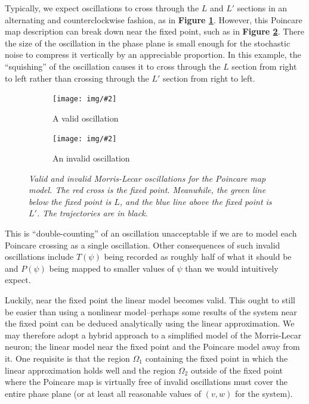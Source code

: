 \documentclass[letterpaper,12pt]{article}
\numberwithin{table}{section}
\numberwithin{figure}{section}
\numberwithin{equation}{section}
\newcommand{\centerfig}[2]{\begin{center}\texttt{[image: img/\#2]}\end{center}}
\newcommand{\ccaption}[1]{\caption{\textit{#1}}}
\newcommand{\reffig}[1]{\textbf{Figure \ref{#1}}}
\begin{document}
\begin{flushleft}
    Typically, we expect oscillations to cross through the $L$ and $L'$ sections in an alternating and counterclockwise fashion, as in \reffig{fig:valid}. However, this Poincare map description can break down near the fixed point, such as in \reffig{fig:invalid-l}. There the size of the oscillation in the phase plane is small enough for the stochastic noise to compress it vertically by an appreciable proportion. In this example, the ``squishing'' of the oscillation causes it to cross through the $L$ section from right to left rather than crossing through the $L'$ section from right to left.
    \begin{figure}[h]

        \centering
    
        \begin{subfigure}{0.49\textwidth}
            \centerfig{0.6}{valid.jpg}
            \caption{A valid oscillation}
            \label{fig:valid}
        \end{subfigure}
        \begin{subfigure}{0.49\textwidth}
            \centerfig{0.6}{invalid-l.jpg}
            \caption{An invalid oscillation}
            \label{fig:invalid-l}
        \end{subfigure}
    
        \captionsetup{width=0.8\linewidth}
        \ccaption{Valid and invalid Morris-Lecar oscillations for the Poincare map model. The red cross is the fixed point. Meanwhile, the green line below the fixed point is $L$, and the blue line above the fixed point is $L'$. The trajectories are in black.}
        \label{fig:pmap-fail}
    
    \end{figure}
    This is ``double-counting'' of an oscillation unacceptable if we are to model each Poincare crossing as a single oscillation. Other consequences of such invalid oscillations include $T(\psi)$ being recorded as roughly half of what it should be and $P(\psi)$ being mapped to smaller values of $\psi$ than we would intuitively expect.

    Luckily, near the fixed point the linear model becomes valid. This ought to still be easier than using a nonlinear model--perhaps some results of the system near the fixed point can be deduced analytically using the linear approximation. We may therefore adopt a hybrid approach to a simplified model of the Morris-Lecar neuron; the linear model near the fixed point and the Poincare model away from it. One requisite is that the region $\Omega_1$ containing the fixed point in which the linear approximation holds well and the region $\Omega_2$ outside of the fixed point where the Poincare map is virtually free of invalid oscillations must cover the entire phase plane (or at least all reasonable values of $(v, w)$ for the system).


\end{flushleft}
\end{document}
